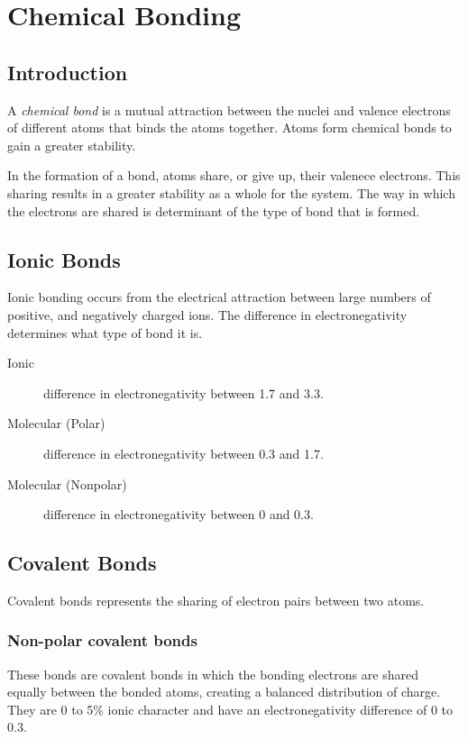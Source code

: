 \chapter{Chemical Bonding}

\section{Introduction}
A \textit{chemical bond} is a mutual attraction between the nuclei and valence
electrons of different atoms that binds the atoms together.  Atoms form chemical
bonds to gain a greater stability.

In the formation of a bond, atoms share, or give up, their valenece electrons.
This sharing results in a greater stability as a whole for the system.  The way
in which the electrons are shared is determinant of the type of bond that is
formed.

\section{Ionic Bonds}
Ionic bonding occurs from the electrical attraction between large numbers of
positive, and negatively charged ions.  The difference in electronegativity
determines what type of bond it is.

\begin{description}
  \item[Ionic] difference in electronegativity between 1.7 and 3.3.
  \item[Molecular (Polar)] difference in electronegativity between 0.3 and 1.7.
  \item[Molecular (Nonpolar)] difference in electronegativity between 0 and 0.3.
\end{description}

\section{Covalent Bonds}
Covalent bonds represents the sharing of electron pairs between two atoms.

\subsection{Non-polar covalent bonds}
These bonds are covalent bonds in which the bonding electrons are shared equally
between the bonded atoms, creating a balanced distribution of charge.  They
are 0 to 5\% ionic character and have an electronegativity difference of 0 to
0.3.

